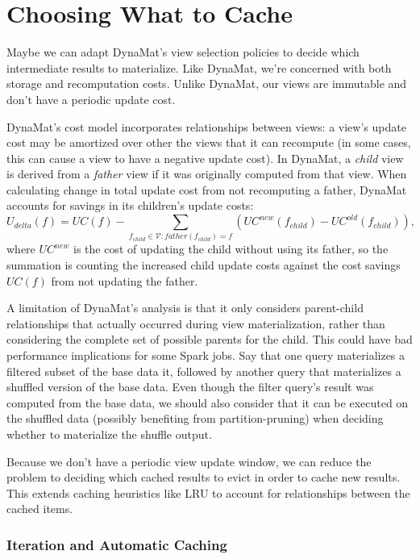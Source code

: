 \documentclass[12pt]{article}
\begin{document}
\section{Choosing What to Cache}

Maybe we can adapt DynaMat's \cite{dynamat} view selection policies to decide
which intermediate results to materialize.  Like DynaMat, we're concerned with
both storage and recomputation costs.  Unlike DynaMat, our views are immutable
and don't have a periodic update cost.

DynaMat's cost model incorporates relationships between views: a view's
update cost may be amortized over other the views that it can recompute
(in some cases, this can cause a view to have a negative update cost).
In DynaMat, a \emph{child} view is derived from a \emph{father} view if
it was originally computed from that view.  When calculating change in total
update cost from not recomputing a father, DynaMat accounts for savings in its
children's update costs:
\[
    U_{delta}(f)
    =
    UC(f)
    - \sum\limits_{f_{child} \in \mathcal{V} : father(f_{child}) = f}
    \left(UC^{new}(f_{child}) - UC^{old}(f_{child})\right),
\]
where $UC^{new}$ is the cost of updating the child without using its father,
so the summation is counting the increased child update costs against the cost
savings $UC(f)$ from not updating the father.

A limitation of DynaMat's analysis is that it only considers parent-child
relationships that actually occurred during view materialization, rather than
considering the complete set of possible parents for the child.
This could have bad performance implications for some Spark jobs.  Say that one 
query materializes a filtered subset of the base data it, followed by another
query that materializes a shuffled version of the base data.  Even though the
filter query's result was computed from the base data, we should also consider
that it can be executed on the shuffled data (possibly benefiting from
partition-pruning) when deciding whether to materialize the shuffle output.

Because we don't have a periodic view update window, we can reduce the problem
to deciding which cached results to evict in order to cache new results.
This extends caching heuristics like LRU to account for relationships between
the cached items.

\subsubsection{Iteration and Automatic Caching}
\end{document}
